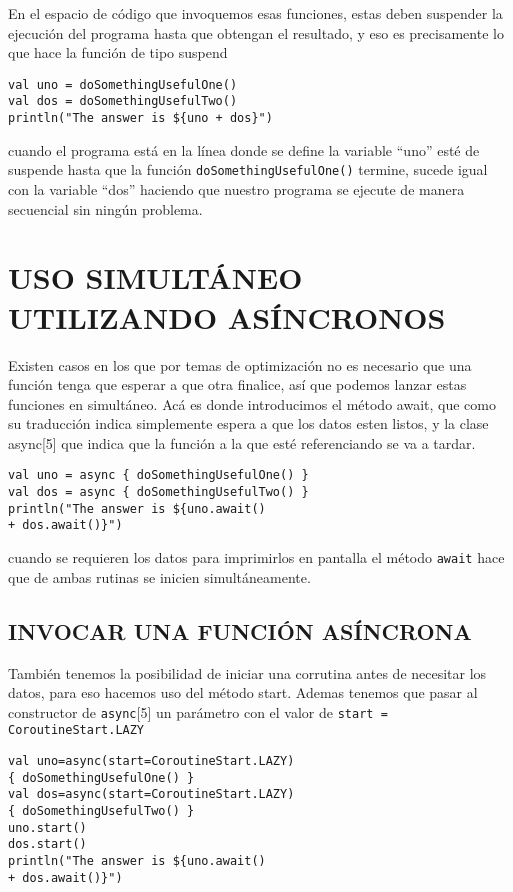 \documentclass[twocolumn,10pt,abstract=on]{asme2ej}
\begin{document}
En el espacio de código que invoquemos esas funciones, estas deben suspender la ejecución del programa hasta que obtengan el resultado, y eso es precisamente lo que hace la función de tipo suspend

\begin{verbatim}
val uno = doSomethingUsefulOne()
val dos = doSomethingUsefulTwo()
println("The answer is ${uno + dos}")
\end{verbatim}

cuando el programa está en la línea donde se define la variable “uno” esté de suspende hasta que la función \verb+doSomethingUsefulOne()+ termine, sucede igual con la variable “dos” haciendo que nuestro programa se ejecute de manera secuencial sin ningún problema.

\section{USO SIMULTÁNEO UTILIZANDO ASÍNCRONOS}

Existen casos en los que por temas de optimización no es necesario que una función tenga que esperar a que otra finalice, así que podemos lanzar estas funciones en simultáneo.
Acá es donde introducimos el método await, que como su traducción indica simplemente espera a que los datos esten listos, y la clase async[5] que indica que la función a la que esté referenciando se va a tardar.

\begin{verbatim}
val uno = async { doSomethingUsefulOne() }
val dos = async { doSomethingUsefulTwo() }
println("The answer is ${uno.await() 
+ dos.await()}")
\end{verbatim}

cuando se requieren los datos para imprimirlos en pantalla el método \verb+await+ hace que de ambas rutinas se inicien simultáneamente.

\subsection{INVOCAR UNA FUNCIÓN ASÍNCRONA}

También tenemos la posibilidad de iniciar una corrutina antes de necesitar los datos, para eso hacemos uso del método start. Ademas tenemos que pasar al constructor de \verb+async+[5] un parámetro con el valor de \verb+start = CoroutineStart.LAZY+

\begin{verbatim}
val uno=async(start=CoroutineStart.LAZY)
{ doSomethingUsefulOne() }
val dos=async(start=CoroutineStart.LAZY) 
{ doSomethingUsefulTwo() }
uno.start()
dos.start()
println("The answer is ${uno.await() 
+ dos.await()}")
\end{verbatim}
\end{document}
